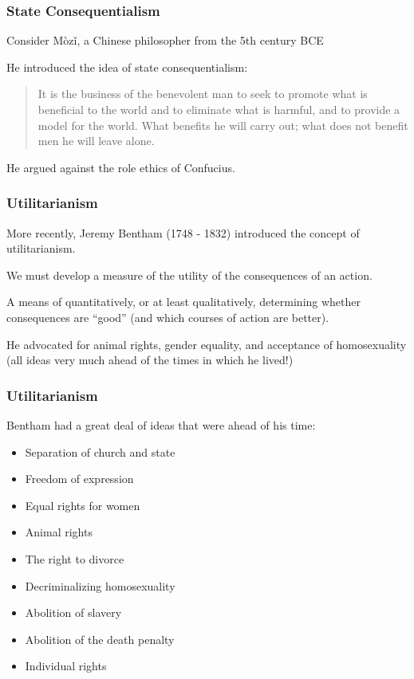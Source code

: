 \begin{frame}
\frametitle{State Consequentialism}

Consider M\`oz\v{i}, a Chinese philosopher from the 5th century BCE


He introduced the idea of state consequentialism:


\begin{quote}
It is the business of the benevolent man to seek to promote what is beneficial to the world and to eliminate what is harmful, and to provide a model for the world. What benefits he will carry out; what does not benefit men he will leave alone.
\end{quote}

He argued against the role ethics of Confucius.


\end{frame}



\begin{frame}
\frametitle{Utilitarianism}

More recently, Jeremy Bentham (1748 - 1832) introduced the concept of \alert{utilitarianism}.

We must develop a measure of the \alert{utility} of the consequences of an action.

A means of quantitatively, or at least qualitatively, determining whether consequences are ``good'' (and which courses of action are better).

He advocated for animal rights, gender equality, and acceptance of homosexuality (all ideas very much ahead of the times in which he lived!)

\end{frame}



\begin{frame}
\frametitle{Utilitarianism}

Bentham had a great deal of ideas that were ahead of his time:

\begin{itemize}
	\item Separation of church and state
	\item Freedom of expression
	\item Equal rights for women
	\item Animal rights
	\item The right to divorce
	\item Decriminalizing homosexuality
	\item Abolition of slavery
	\item Abolition of the death penalty
	\item Individual rights
\end{itemize}

\end{frame}



